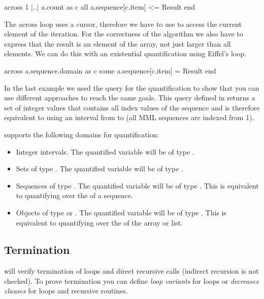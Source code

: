 \begin{erunning}[numbers=none]
across 1 |..| a.count as c all a.sequence[c.item] <= Result end
\end{erunning}

The across loop uses a cursor, therefore we have to use  to access the current element of the iteration. For the correctness of the algorithm we also have to express that the result is an element of the array, not just larger than all elements. We can do this with an existential quantification using Eiffel's  loop.

\begin{erunning}[numbers=none]
across a.sequence.domain as c some a.sequence[c.item] = Result end
\end{erunning}

In the last example we used the  query for the quantification to show that you can use different approaches to reach the same goals. This query defined in  returns a set of integer values that contains all index values of the sequence and is therefore equivalent to using an interval from  to  (all MML sequences are indexed from 1).

\AutoProof supports the following domains for quantification:
\begin{itemize}
\item Integer intervals. The quantified variable will be of type .
\item Sets of type . The quantified variable will be of type .
\item Sequences of type . The quantified variable will be of type . This is equivalent to quantifying over the  of a sequence.
\item Objects of type  or . The quantified variable will be of type . This is equivalent to quantifying over the  of the array or list.
\end{itemize}

\subsection{Termination}

\AutoProof will verify termination of loops and direct recursive calls (indirect recursion is not checked). To prove termination you can define \emph{loop variants} for loops or \emph{decreases clauses} for loops and recursive routines.

